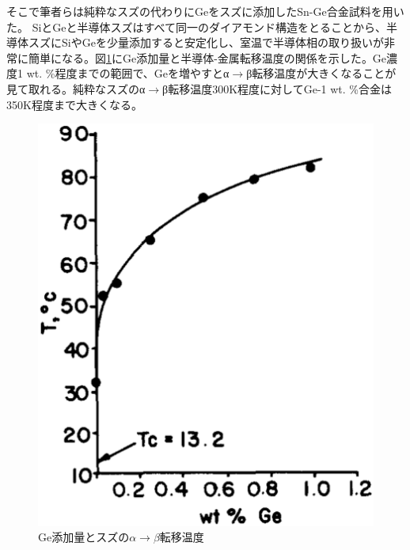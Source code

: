 そこで筆者らは純粋なスズの代わりにGeをスズに添加したSn-Ge合金試料を用いた。
SiとGeと半導体スズはすべて同一のダイアモンド構造をとることから、半導体スズにSiやGeを少量添加すると安定化し\cite{Ewald1954,Gallerneault1983}、室温で半導体相の取り扱いが非常に簡単になる。図\ref{fig:Ge_Stabilized_Sn}にGe添加量と半導体-金属転移温度の関係を示した\cite{Vnuk1984}。Ge濃度1 wt. \%程度までの範囲で、Geを増やすとα$\to$β転移温度が大きくなることが見て取れる。純粋なスズのα$\to$β転移温度300K程度に対してGe-1 wt. \%合金は350K程度まで大きくなる。
\begin{figure}[!h]
 \begin{minipage}{0.4\hsize}
    \begin{center}
   \includegraphics[width=\hsize]{Introduction/Ge_Stabilized_Sn.eps}
  \end{center}
  \caption{Ge添加量とスズの$\alpha \to \beta$転移温度\cite{Vnuk1984}}
  \label{fig:Ge_Stabilized_Sn}
 \end{minipage}
 \begin{minipage}{0.6\hsize}
    \begin{center}

\end{center}
\end{minipage}
\end{figure}
